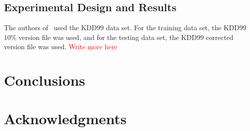 \documentclass{sig-alternate}
\newcommand{\mycomment}[1]{\textcolor{red}{#1}}
\begin{document}
\subsection{Experimental Design and Results}
The authors of~\cite{DBLP:journals/corr/abs-1204-1336} used the KDD99 data set. For the training data set, the KDD99 10\% version file was used, and for the testing data set, the KDD99 corrected version file was used. 
\mycomment{Write more here}




\section{Conclusions}





\section{Acknowledgments}





  
\end{document}
